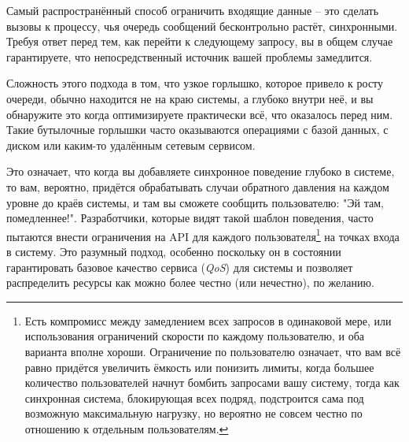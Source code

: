 \documentclass[11pt, oneside]{book}   	%
\begin{document}
Самый распространённый способ ограничить входящие данные -- это сделать вызовы к процессу, чья очередь сообщений бесконтрольно растёт, синхронными. Требуя ответ перед тем, как перейти к следующему запросу, вы в общем случае гарантируете, что непосредственный источник вашей проблемы замедлится.

Сложность этого подхода в том, что узкое горлышко, которое привело к росту очереди, обычно находится не на краю системы, а глубоко внутри неё, и вы обнаружите это когда оптимизируете практически всё, что оказалось перед ним. Такие бутылочные горлышки часто оказываются операциями с базой данных, с диском или каким-то удалённым сетевым сервисом.

Это означает, что когда вы добавляете синхронное поведение глубоко в системе, то вам, вероятно, придётся обрабатывать случаи обратного давления на каждом уровне до краёв системы, и там вы сможете сообщить пользователю: "Эй там, помедленнее!".
Разработчики, которые видят такой шаблон поведения, часто пытаются внести ограничения на API для каждого пользователя\footnote{Есть компромисс между замедлением всех запросов в одинаковой мере, или использования ограничений скорости по каждому пользователю, и оба варианта вполне хороши. Ограничение по пользователю означает, что вам всё равно придётся увеличить ёмкость или понизить лимиты, когда большее количество пользователей начнут бомбить запросами вашу систему, тогда как синхронная система, блокирующая всех подряд, подстроится сама под возможную максимальную нагрузку, но вероятно не совсем честно по отношению к отдельным пользователям.} на точках входа в систему. Это разумный подход, особенно поскольку он в состоянии гарантировать базовое качество сервиса (\emph{QoS}) для системы и позволяет распределить ресурсы как можно более честно (или нечестно), по желанию.
\end{document}
